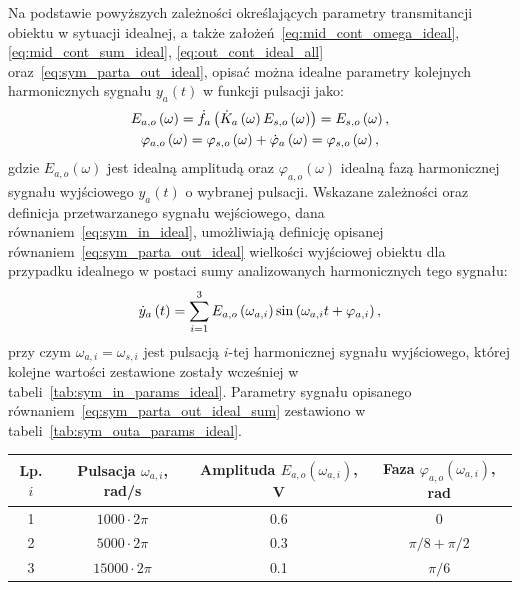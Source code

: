 Na podstawie powyższych zależności określających parametry transmitancji obiektu w sytuacji idealnej, a także założeń~\eqref{eq:mid_cont_omega_ideal}, \eqref{eq:mid_cont_sum_ideal}, \eqref{eq:out_cont_ideal_all} oraz~\eqref{eq:sym_parta_out_ideal}, opisać można idealne parametry kolejnych harmonicznych sygnału $y_{a}(t)$ w funkcji pulsacji jako:
\begin{gather}
E_{a,o} \left(\omega\right) = \dot{f}_{a} \left(\dot{K}_{a} \left(\omega\right) E_{s,o} \left(\omega\right)\right) = E_{s,o} \left(\omega\right) \label{eq:sym_parta_amp_out_ideal}, \\
\varphi_{a,o} \left(\omega\right) = \varphi_{s,o} \left(\omega\right) + \dot{\varphi}_{a} \left(\omega\right) = \varphi_{s,o} \left(\omega\right) \label{eq:sym_parta_phi_out_ideal},
\end{gather}
gdzie $E_{a,o}(\omega)$ jest idealną amplitudą oraz $\varphi_{a,o}(\omega)$ idealną fazą harmonicznej sygnału wyjściowego $y_{a}(t)$ o wybranej pulsacji. Wskazane zależności oraz definicja przetwarzanego sygnału wejściowego, dana równaniem~\eqref{eq:sym_in_ideal}, umożliwiają definicję opisanej równaniem~\eqref{eq:sym_parta_out_ideal} wielkości wyjściowej obiektu dla przypadku idealnego w postaci sumy analizowanych harmonicznych tego sygnału:
\begin{equation}
\dot{y}_{a} \left(t\right) = \sum _{i=1} ^{3} E_{a,o} \left(\omega_{a,i}\right) \sin \left(\omega_{a,i} t + \varphi_{a,i}\right) \label{eq:sym_parta_out_ideal_sum},
\end{equation}
przy czym $\omega_{a,i} = \omega_{s,i}$ jest pulsacją $i$-tej harmonicznej sygnału wyjściowego, której kolejne wartości zestawione zostały wcześniej w tabeli~\ref{tab:sym_in_params_ideal}. Parametry sygnału opisanego równaniem~\eqref{eq:sym_parta_out_ideal_sum} zestawiono w tabeli~\ref{tab:sym_outa_params_ideal}.

\begin{table}[htb!]
\begin{center}
\begin{tabular}[c]{| c | c | c | c |} \hline
\textbf{Lp. $i$} & \textbf{Pulsacja $\omega_{a,i}$, rad/s} & \textbf{Amplituda $E_{a,o}(\omega_{a,i})$, V} & \textbf{Faza $\varphi_{a,o}(\omega_{a,i})$, rad} \\ \hline
1 & $1000  \cdot 2\pi$ &  0.6 & $0$               \\ \hline
2 & $5000  \cdot 2\pi$ &  0.3 & $\pi/8 + \pi/2$   \\ \hline
3 & $15000 \cdot 2\pi$ &  0.1 & $\pi/6$           \\ \hline
\end{tabular}
\end{center}
\end{table}

